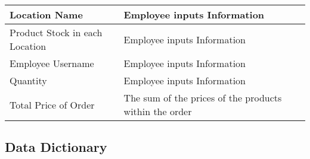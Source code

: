  \begin{tabular}{|p{4cm}|p{6cm}|}
        \hline	
	{Location Name} & {Employee inputs Information}\\ \hline
	{Product Stock in each Location} & {Employee inputs Information}\\ \hline
	{Employee Username} & {Employee inputs Information}\\ \hline
	{Quantity} & {Employee inputs Information}\\ \hline
	{Total Price of Order} & {The sum of the prices of the products within the order} \\ \hline
   \end{tabular}

\subsection{Data Dictionary}

